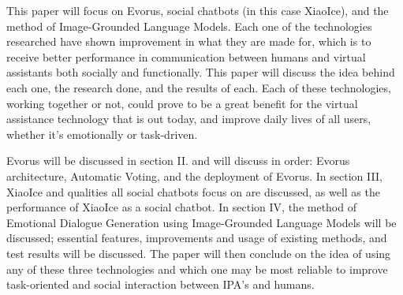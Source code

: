 \documentclass[letterpaper, 10 pt, conference]{IEEEtran}
\begin{document}
\par This paper will focus on Evorus, social chatbots (in this case XiaoIce), and the method of Image-Grounded Language Models. Each one of the technologies researched have shown improvement in what they are made for, which is to receive better performance in communication between humans and virtual assistants both socially and functionally. This paper will discuss the idea behind each one, the research done, and the results of each. Each of these technologies, working together or not, could prove to be a great benefit for the virtual assistance technology that is out today, and improve daily lives of all users, whether it's emotionally or task-driven. \par Evorus will be discussed in section II. and will discuss in order: Evorus architecture, Automatic Voting, and the deployment of Evorus. In section III, XiaoIce and qualities all social chatbots focus on are discussed, as well as the performance of XiaoIce as a social chatbot. In section IV, the method of Emotional Dialogue Generation using Image-Grounded Language Models will be discussed; essential features, improvements and usage of existing methods, and test results will be discussed. The paper will then conclude on the idea of using any of these three technologies and which one may be most reliable to improve task-oriented and social interaction between IPA's and humans. 
\end{document}
